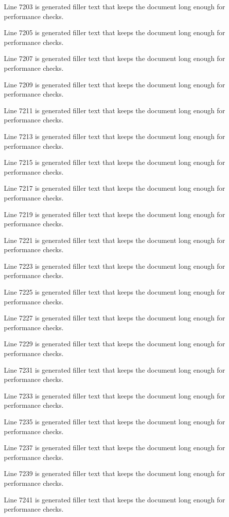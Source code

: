 Line 7203 is generated filler text that keeps the document long enough for performance checks.

Line 7205 is generated filler text that keeps the document long enough for performance checks.

Line 7207 is generated filler text that keeps the document long enough for performance checks.

Line 7209 is generated filler text that keeps the document long enough for performance checks.

Line 7211 is generated filler text that keeps the document long enough for performance checks.

Line 7213 is generated filler text that keeps the document long enough for performance checks.

Line 7215 is generated filler text that keeps the document long enough for performance checks.

Line 7217 is generated filler text that keeps the document long enough for performance checks.

Line 7219 is generated filler text that keeps the document long enough for performance checks.

Line 7221 is generated filler text that keeps the document long enough for performance checks.

Line 7223 is generated filler text that keeps the document long enough for performance checks.

Line 7225 is generated filler text that keeps the document long enough for performance checks.

Line 7227 is generated filler text that keeps the document long enough for performance checks.

Line 7229 is generated filler text that keeps the document long enough for performance checks.

Line 7231 is generated filler text that keeps the document long enough for performance checks.

Line 7233 is generated filler text that keeps the document long enough for performance checks.

Line 7235 is generated filler text that keeps the document long enough for performance checks.

Line 7237 is generated filler text that keeps the document long enough for performance checks.

Line 7239 is generated filler text that keeps the document long enough for performance checks.

Line 7241 is generated filler text that keeps the document long enough for performance checks.

